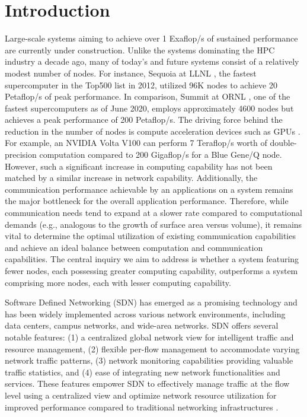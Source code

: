 \chapter{Introduction}

Large-scale systems aiming to achieve over 1 Exaflop/s of sustained performance
are currently under construction. Unlike the systems dominating the HPC industry
a decade ago, many of today's and future systems consist of a relatively modest
number of nodes. For instance, Sequoia at LLNL \cite{sequa}, the fastest supercomputer in
the Top500 list in 2012, utilized 96K nodes to achieve 20 Petaflop/s of peak
performance. In comparison, Summit at ORNL \cite{summit}, one of the fastest
supercomputers as of June 2020, employs approximately 4600 nodes but achieves a
peak performance of 200 Petaflop/s. The driving force behind the reduction in the
number of nodes is compute acceleration devices such as GPUs \cite{owens2008gpu}. For example,
an NVIDIA Volta V100 can perform 7 Teraflop/s worth of double-precision
computation compared to 200 Gigaflop/s for a Blue Gene/Q node. However, such a
significant increase in computing capability has not been matched by a similar
increase in network capability. Additionally, the communication performance
achievable by an applications on a system remains the major bottleneck for the overall 
application performance.  Therefore, while communication needs tend to expand at a slower
rate compared to computational demands (e.g., analogous to the growth of surface
area versus volume), it remains vital to determine the optimal utilization of
existing communication capabilities and achieve an ideal balance between
computation and communication capabilities.  The central inquiry we aim to
address is whether a system featuring fewer nodes, each possessing greater
computing capability, outperforms a system comprising more nodes, each with
lesser computing capability. 


Software Defined Networking (SDN) \cite{kreutz2014software} has emerged as a promising technology and
has been widely implemented across various network environments, including data
centers, campus networks, and wide-area networks. SDN offers several notable
features: (1) a centralized global network view for intelligent traffic and
resource management, (2) flexible per-flow management to accommodate varying
network traffic patterns, (3) network monitoring capabilities providing valuable
traffic statistics, and (4) ease of integrating new network functionalities and
services. These features empower SDN to effectively manage traffic at the flow
level using a centralized view and optimize network resource utilization for
improved performance compared to traditional networking infrastructures \cite{tr2016sdn}.

